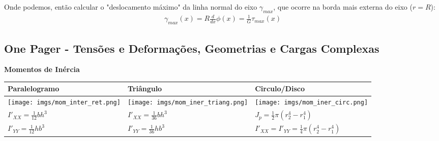 \documentclass{article}
\begin{document}
Onde podemos, então calcular o "deslocamento máximo" da linha normal do eixo $\gamma_{max}$, que ocorre na borda mais externa do eixo ($r = R$):
\begin{align*}
    \gamma_{max} (x)= R \frac{d}{dx}\phi(x) = \frac{1}{G}\tau_{max}(x)
\end{align*}

\newpage
\subsection{One Pager - Tensões e Deformações, Geometrias e Cargas Complexas}

\textbf{Momentos de Inércia}
\begin{table}[h]\tiny
    \begin{tabularx}{\textwidth}{@{}|Y|Y|Y|@{}} \hline
        \textbf{Paralelogramo}                                         & \textbf{Triângulo}           & \textbf{Circulo/Disco}                                         \\ \hline \hline
        \begin{minipage}{\linewidth}
            \centering
            \texttt{[image: imgs/mom\_inter\_ret.png]}
        \end{minipage}   &
        \begin{minipage}{\linewidth}
            \centering
            \texttt{[image: imgs/mom\_iner\_triang.png]}
        \end{minipage} &
        \begin{minipage}{\linewidth}
            \centering
            \texttt{[image: imgs/mom\_iner\_circ.png]}
        \end{minipage}                                                                                                    \\

        $I'_{XX} = \frac{1}{12}bh^3$                                   & $I'_{XX} = \frac{1}{36}bh^3$ & $J_p = \frac{1}{2} \pi \left(r_2^4 - r_1^4 \right)$            \\
        $I'_{YY} = \frac{1}{12}hb^3$                                   & $I'_{YY}=\frac{1}{36}hb^3$   & $I'_{XX} = I'_{YY} = \frac{1}{4}\pi\left(r_2^4 - r_1^4\right)$ \\ \hline
    \end{tabularx}
\end{table}
\end{document}
